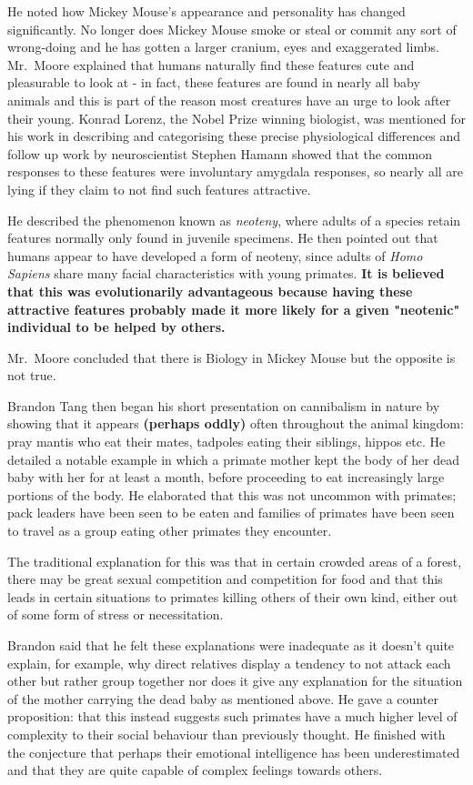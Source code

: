 He noted how Mickey Mouse's appearance and personality has changed
significantly. No longer does Mickey Mouse smoke or steal or commit any
sort of wrong-doing and he has gotten a larger cranium, eyes and
exaggerated limbs. Mr.~Moore explained that humans naturally find these
features cute and pleasurable to look at - in fact, these features are
found in nearly all baby animals and this is part of the reason most
creatures have an urge to look after their young. Konrad Lorenz, the
Nobel Prize winning biologist, was mentioned for his work in describing
and categorising these precise physiological differences and follow up
work by neuroscientist Stephen Hamann showed that the common responses
to these features were involuntary amygdala responses, so nearly all are
lying if they claim to not find such features attractive.

He described the phenomenon known as \textit{neoteny}, where adults of a
species retain features normally only found in juvenile specimens. He
then pointed out that humans appear to have developed a form of neoteny,
since adults of \textit{Homo Sapiens} share many facial characteristics
with young primates.
\textbf{It is believed that this was evolutionarily advantageous because having these attractive features probably made it more likely for a given "neotenic" individual to be helped by others.}

Mr.~Moore concluded that there is Biology in Mickey Mouse but the
opposite is not true.

Brandon Tang then began his short presentation on cannibalism in nature
by showing that it appears \textbf{(perhaps oddly)} often throughout the
animal kingdom: pray mantis who eat their mates, tadpoles eating their
siblings, hippos etc. He detailed a notable example in which a primate
mother kept the body of her dead baby with her for at least a month,
before proceeding to eat increasingly large portions of the body. He
elaborated that this was not uncommon with primates; pack leaders have
been seen to be eaten and families of primates have been seen to travel
as a group eating other primates they encounter.

The traditional explanation for this was that in certain crowded areas
of a forest, there may be great sexual competition and competition for
food and that this leads in certain situations to primates killing
others of their own kind, either out of some form of stress or
necessitation.

Brandon said that he felt these explanations were inadequate as it
doesn't quite explain, for example, why direct relatives display a
tendency to not attack each other but rather group together nor does it
give any explanation for the situation of the mother carrying the dead
baby as mentioned above. He gave a counter proposition: that this
instead suggests such primates have a much higher level of complexity to
their social behaviour than previously thought. He finished with the
conjecture that perhaps their emotional intelligence has been
underestimated and that they are quite capable of complex feelings
towards others.

